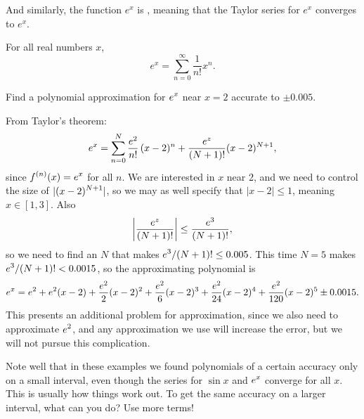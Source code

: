 And similarly, the function $e^x$ is ,
meaning that the Taylor series for $e^x$ converges to $e^x$.
\begin{theorem}\label{thm:exp-is-analytic}
  For all real numbers $x$,
  $$
  e^x = \sum_{n=0}^\infty \frac{1}{n!} x^{n}.
  $$  
\end{theorem}


\begin{example} Find a polynomial approximation for $\displaystyle e^x$ near $x=2$
accurate to $\pm
0.005$. 
\end{example}
\begin{solution}
From Taylor's theorem:
$$
  e^x= \sum_{n=0}^N{e^2\over n!}\,(x-2)^n + 
  {e^z\over (N+1)!}(x-2)^{N+1},
$$
since $\displaystyle f^{(n)}(x)=e^x$ for all $n$. We are interested in $x$ near
2, and we need to control the size of $\displaystyle |(x-2)^{N+1}|$, so we may
as well specify that $|x-2|\le 1$, meaning $x\in[1,3]$.  Also
$$\left|{e^z\over (N+1)!}\right|\le {e^3\over (N+1)!},$$
so we need to find an $N$ that makes $\displaystyle e^3/(N+1)!\le 0.005$. This time
$N=5$ makes $\displaystyle e^3/(N+1)!< 0.0015$, so the approximating polynomial is
$$
  e^x=e^2+e^2(x-2)+{e^2\over2}(x-2)^2+{e^2\over6}(x-2)^3+
  {e^2\over24}(x-2)^4+{e^2\over120}(x-2)^5
  \pm 0.0015.
$$
This presents an additional problem for approximation, since we also
need to approximate $\displaystyle e^2$, and any approximation we use will increase
the error, but we will not pursue this complication.
\end{solution}

Note well that in these examples we found polynomials of a certain
accuracy only on a small interval, even though the series for $\sin x$
and $\displaystyle e^x$ converge for all $x$.  This is usually how things work
out.  To get the same accuracy on a larger interval, what can you do?
Use more terms!

